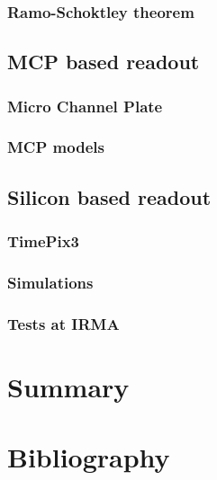 \begin{refsection}
	\subsubsection{Ramo-Schoktley theorem}
	\subsection{MCP based readout}
	\subsubsection{Micro Channel Plate}
	\subsubsection{MCP models}
  \subsection{Silicon based readout}
  \subsubsection{TimePix3}
	\subsubsection{Simulations}
	\subsubsection{Tests at IRMA}

	\section{Summary}
	\label{ch3:Summary}
	\lipsum

	\cleardoublepage
	\section{Bibliography}
	\label{ch3:bib}
	\printbibliography[heading=subbibliography]
\end{refsection}